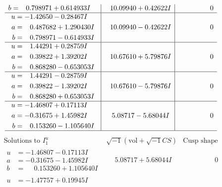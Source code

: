 \documentclass[1p]{elsarticle_modified}
\theoremstyle{definition}
\newcommand{\I}{\sqrt{-1}}
\begin{document}
$$\begin{array}{c|c|c}
\begin{aligned}
b &= \phantom{-}0.798971 + 0.614933 I\end{aligned}
 & \phantom{-}10.09940 + 0.42622 I & \phantom{-0.000000 } 0 \\ \hline\begin{aligned}
u &= -1.42650 - 0.28467 I \\
a &= \phantom{-}0.487682 + 1.290430 I \\
b &= \phantom{-}0.798971 - 0.614933 I\end{aligned}
 & \phantom{-}10.09940 - 0.42622 I & \phantom{-0.000000 } 0 \\ \hline\begin{aligned}
u &= \phantom{-}1.44291 + 0.28759 I \\
a &= \phantom{-}0.39822 + 1.39202 I \\
b &= \phantom{-}0.868280 - 0.653053 I\end{aligned}
 & \phantom{-}10.67610 + 5.79876 I & \phantom{-0.000000 } 0 \\ \hline\begin{aligned}
u &= \phantom{-}1.44291 - 0.28759 I \\
a &= \phantom{-}0.39822 - 1.39202 I \\
b &= \phantom{-}0.868280 + 0.653053 I\end{aligned}
 & \phantom{-}10.67610 - 5.79876 I & \phantom{-0.000000 } 0 \\ \hline\begin{aligned}
u &= -1.46807 + 0.17113 I \\
a &= -0.31675 + 1.45982 I \\
b &= \phantom{-}0.153260 - 1.105640 I\end{aligned}
 & \phantom{-}5.08717 - 5.68044 I & \phantom{-0.000000 } 0\\
 \hline 
 \end{array}$$\newpage$$\begin{array}{c|c|c}  
\text{Solutions to }I^u_{1}& \I (\text{vol} + \sqrt{-1}CS) & \text{Cusp shape}\\
 \hline 
\begin{aligned}
u &= -1.46807 - 0.17113 I \\
a &= -0.31675 - 1.45982 I \\
b &= \phantom{-}0.153260 + 1.105640 I\end{aligned}
 & \phantom{-}5.08717 + 5.68044 I & \phantom{-0.000000 } 0 \\ \hline\begin{aligned}
u &= -1.47757 + 0.19945 I \\

\end{aligned}
\end{array}$$
\end{document}
